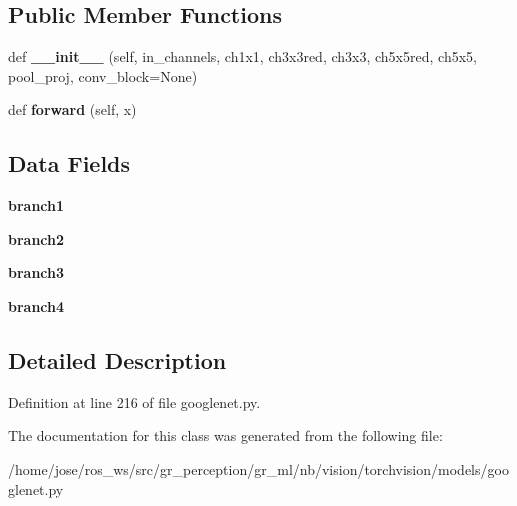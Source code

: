 \subsection*{Public Member Functions}
\begin{DoxyCompactItemize}
\item 
\mbox{\label{classtorchvision_1_1models_1_1googlenet_1_1Inception_aeccc1703b04ced5b5dc8795f14ecf586}} 
def {\bfseries \+\_\+\+\_\+init\+\_\+\+\_\+} (self, in\+\_\+channels, ch1x1, ch3x3red, ch3x3, ch5x5red, ch5x5, pool\+\_\+proj, conv\+\_\+block=None)
\item 
\mbox{\label{classtorchvision_1_1models_1_1googlenet_1_1Inception_abd98f21eb0f03228fcca3798f037b7ef}} 
def {\bfseries forward} (self, x)
\end{DoxyCompactItemize}
\subsection*{Data Fields}
\begin{DoxyCompactItemize}
\item 
\mbox{\label{classtorchvision_1_1models_1_1googlenet_1_1Inception_ab3815130997486432af972bc7a01487c}} 
{\bfseries branch1}
\item 
\mbox{\label{classtorchvision_1_1models_1_1googlenet_1_1Inception_a59575f4474b76917f2d28e470bad6d84}} 
{\bfseries branch2}
\item 
\mbox{\label{classtorchvision_1_1models_1_1googlenet_1_1Inception_a4198b7bd93871a3248bd9805a4a34524}} 
{\bfseries branch3}
\item 
\mbox{\label{classtorchvision_1_1models_1_1googlenet_1_1Inception_a3c35b845f8b68ea186a8aa7764832fce}} 
{\bfseries branch4}
\end{DoxyCompactItemize}


\subsection{Detailed Description}


Definition at line 216 of file googlenet.\+py.



The documentation for this class was generated from the following file\+:\begin{DoxyCompactItemize}
\item 
/home/jose/ros\+\_\+ws/src/gr\+\_\+perception/gr\+\_\+ml/nb/vision/torchvision/models/googlenet.\+py\end{DoxyCompactItemize}
